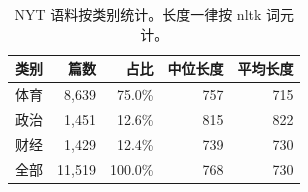 \begin{table}[t]
\centering
\footnotesize
\caption{NYT 语料按类别统计。长度一律按 nltk 词元计。}
\label{tab:dataset}
\begin{tabular}{lrrrr}
\toprule
类别 & 篇数 & 占比 & 中位长度 & 平均长度 \\
\midrule
体育 & 8,639 & 75.0\% & 757 & 715\\
政治 & 1,451 & 12.6\% & 815 & 822\\
财经 & 1,429 & 12.4\% & 739 & 730\\
\midrule
全部 & 11,519 & 100.0\% & 768 & 730 \\
\bottomrule
\end{tabular}
\end{table}

